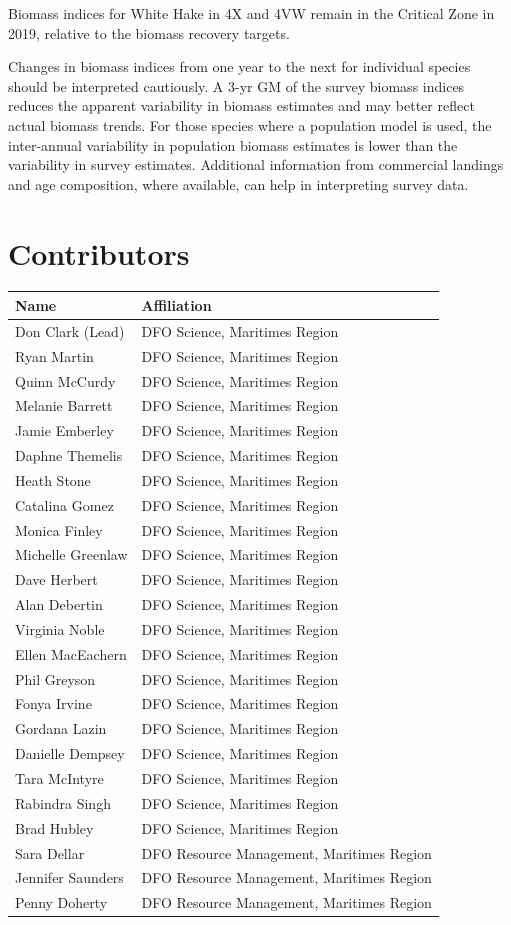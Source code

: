 \documentclass[11pt]{book}
\begin{document}
Biomass indices for White Hake in 4X and 4VW remain in the Critical Zone in 2019, relative to the biomass recovery targets.

Changes in biomass indices from one year to the next for individual species should be interpreted cautiously. A 3-yr GM of the survey biomass indices reduces the apparent variability in biomass estimates and may better reflect actual biomass trends. For those species where a population model is used, the inter-annual variability in population biomass estimates is lower than the variability in survey estimates. Additional information from commercial landings and age composition, where available, can help in interpreting survey data.

\hypertarget{contributors}{%
\section{Contributors}\label{contributors}}
\begin{longtable}[]{@{}ll@{}}
\toprule
Name & Affiliation\tabularnewline
\midrule
\endhead
Don Clark (Lead) & DFO Science, Maritimes Region\tabularnewline
Ryan Martin & DFO Science, Maritimes Region\tabularnewline
Quinn McCurdy & DFO Science, Maritimes Region\tabularnewline
Melanie Barrett & DFO Science, Maritimes Region\tabularnewline
Jamie Emberley & DFO Science, Maritimes Region\tabularnewline
Daphne Themelis & DFO Science, Maritimes Region\tabularnewline
Heath Stone & DFO Science, Maritimes Region\tabularnewline
Catalina Gomez & DFO Science, Maritimes Region\tabularnewline
Monica Finley & DFO Science, Maritimes Region\tabularnewline
Michelle Greenlaw & DFO Science, Maritimes Region\tabularnewline
Dave Herbert & DFO Science, Maritimes Region\tabularnewline
Alan Debertin & DFO Science, Maritimes Region\tabularnewline
Virginia Noble & DFO Science, Maritimes Region\tabularnewline
Ellen MacEachern & DFO Science, Maritimes Region\tabularnewline
Phil Greyson & DFO Science, Maritimes Region\tabularnewline
Fonya Irvine & DFO Science, Maritimes Region\tabularnewline
Gordana Lazin & DFO Science, Maritimes Region\tabularnewline
Danielle Dempsey & DFO Science, Maritimes Region\tabularnewline
Tara McIntyre & DFO Science, Maritimes Region\tabularnewline
Rabindra Singh & DFO Science, Maritimes Region\tabularnewline
Brad Hubley & DFO Science, Maritimes Region\tabularnewline
Sara Dellar & DFO Resource Management, Maritimes Region\tabularnewline
Jennifer Saunders & DFO Resource Management, Maritimes Region\tabularnewline
Penny Doherty & DFO Resource Management, Maritimes Region\tabularnewline
\bottomrule
\end{longtable}
\addtocounter{table}{-1}
\end{document}
